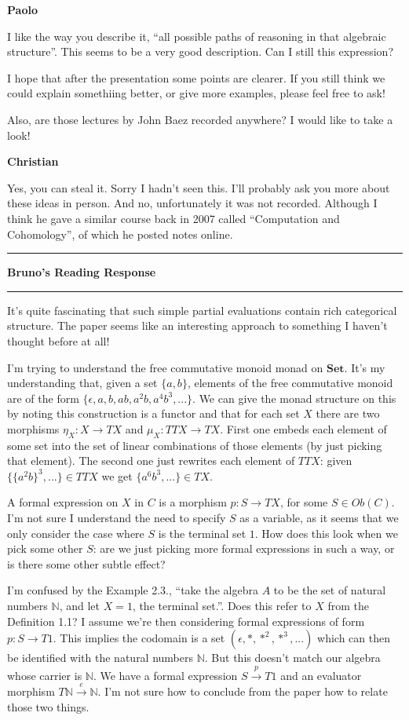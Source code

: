 \documentclass{amsart}
\newcommand{\iam}[1]{
  \vspace{0.25em}
  \hrule
  \vspace{0.25em}
  \textbf{{#1}'s Reading Response}
  \vspace{0.25em}
  \hrule
  \vspace{1em}
}
\newcommand{\respond}[1]{
  \vspace{1em} \textbf{#1}
}
\begin{document}
\respond{Paolo}

I like the way you describe it, ``all possible paths of reasoning in that algebraic structure''. This seems to be a very good description. Can I still this expression?

I hope that after the presentation some points are clearer. If you still think we could explain somethiing better, or give more examples, please feel free to ask!

Also, are those lectures by John Baez recorded anywhere? I would like to take a look!

\respond{Christian}

Yes, you can steal it. Sorry I hadn't seen this. I'll probably ask you more about these ideas in person. And no, unfortunately it was not recorded. Although I think he gave a similar course back in 2007 called ``Computation and Cohomology'', of which he posted notes online.

\iam{Bruno}

It's quite fascinating that such simple partial evaluations contain rich
categorical structure. The paper seems like an interesting approach to something I haven't thought before at all!

I'm trying to understand the free commutative monoid monad on $\mathbf{Set}$.
It's my understanding that, given a set $\{a, b\}$, elements of the free
commutative monoid are of the form $\{\epsilon, a, b, ab, a^2b, a^4b^3,...\}$.
We can give the monad structure on this by noting this construction is a functor and that for each set $X$ there are two morphisms $\eta_X: X \rightarrow TX$ and $\mu_X:TTX
\rightarrow TX$. First one embeds each element of some set into the set of linear
combinations of those elements (by just picking that element). The second one
just rewrites each element of $TTX$: given $\{\{a^2b\}^3, ...\} \in TTX$ we get
$\{a^6b^3, ...\} \in TX$.

A formal expression on $X$ in ${C}$ is a morphism $p: S \rightarrow
TX$, for some $S \in Ob({C})$. I'm not sure I understand the need to specify
$S$ as a variable, as it seems that we only consider the case where $S$ is the terminal set $1$. How does this look when we pick some other $S$: are we just picking more
formal expressions in such a way, or is there some other subtle effect?

I'm confused by the Example 2.3., ``take the algebra $A$ to be the set of
natural numbers $\mathbb{N}$, and let $X = 1$, the terminal set.''.  Does this refer to $X$ from the Definition 1.1? I assume we're then considering
formal expressions of form $p: S \rightarrow T 1$. This implies the codomain is
a set $(\epsilon, *, *^2, *^3,...)$ which can then be identified with the
natural numbers $\mathbb{N}$. But this doesn't match our algebra whose carrier
is $\mathbb{N}$. We have a formal expression $S \xrightarrow{p} T1$ and an
evaluator morphism $T\mathbb{N} \xrightarrow{e} \mathbb{N}$. I'm not sure how to
conclude from the paper how to relate those two things.
\end{document}
